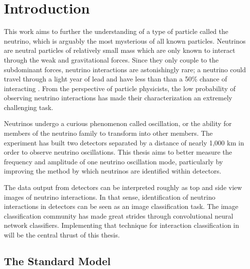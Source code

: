 \chapter{Introduction}
\label{intro_chapter}


This work aims to further the understanding of a type of particle called
the neutrino, which is arguably the most mysterious of all known particles.
Neutrinos are neutral particles of relatively small mass which are only
known to interact through the weak and gravitational forces.
Since they only couple to the subdominant forces, neutrino interactions are
astonishingly rare; a neutrino could travel through a light year of lead and
have less than than a 50\% chance of interacting \cite{petit2013heart}.
From the perspective of particle
physicists, the low probability of observing neutrino interactions has made
their characterization an extremely challenging task.

Neutrinos undergo a curious phenomenon called oscillation, or the ability for
members of the neutrino family to transform into other members.  The \nova
experiment has built two detectors separated by a distance of nearly 1,000 km
in order to observe neutrino oscillations.  This thesis aims to better measure
the frequency and amplitude of one neutrino oscillation mode, particularly by
improving the
method by which neutrinos are identified within \nova detectors.


The data output from \nova detectors can be interpreted roughly as top and side
view images of neutrino interactions.  In that sense, identification of
neutrino interactions in \nova detectors can be seen as an image classification
task.  The image classification community has made great strides through
convolutional neural network classifiers.  Implementing that technique for
interaction classification in \nova will be the central thrust of this thesis.



\section{The Standard Model}

